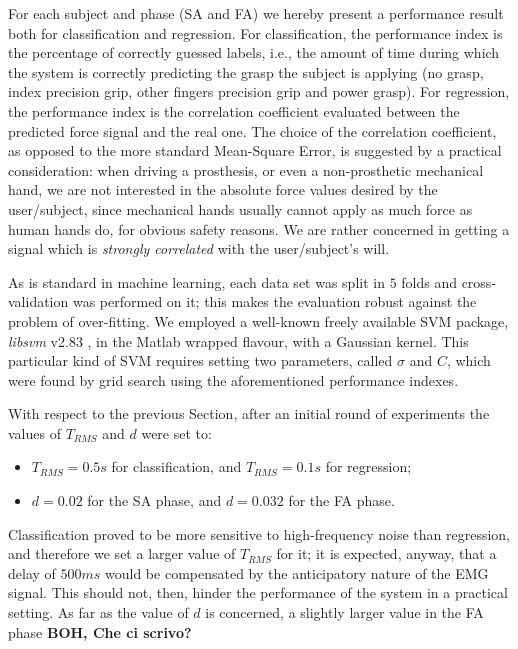 For each subject and phase (SA and FA) we hereby present a performance
result both for classification and regression. For classification, the
performance index is the percentage of correctly guessed labels, i.e.,
the amount of time during which the system is correctly predicting the
grasp the subject is applying (no grasp, index precision grip, other
fingers precision grip and power grasp). For regression, the
performance index is the correlation coefficient evaluated between the
predicted force signal and the real one. The choice of the correlation
coefficient, as opposed to the more standard Mean-Square Error, is
suggested by a practical consideration: when driving a prosthesis, or
even a non-prosthetic mechanical hand, we are not interested in the
absolute force values desired by the user/subject, since mechanical
hands usually cannot apply as much force as human hands do, for
obvious safety reasons. We are rather concerned in getting a signal
which is \emph{strongly correlated} with the user/subject's will.

As is standard in machine learning, each data set was split in $5$
folds and cross-validation was performed on it; this makes the
evaluation robust against the problem of over-fitting. We employed a
well-known freely available SVM package, \emph{libsvm} v2.83
\cite{ChangL01}, in the Matlab wrapped flavour, with a Gaussian
kernel. This particular kind of SVM requires setting two parameters,
called $\sigma$ and $C$, which were found by grid search using the
aforementioned performance indexes.

With respect to the previous Section, after an initial round of
experiments the values of $T_{RMS}$ and $d$ were set to:

\begin{itemize}

  \item $T_{RMS}=0.5s$ for classification, and $T_{RMS}=0.1s$ for regression;

  \item $d=0.02$ for the SA phase, and $d=0.032$ for the FA phase.

\end{itemize}

Classification proved to be more sensitive to high-frequency noise
than regression, and therefore we set a larger value of $T_{RMS}$ for
it; it is expected, anyway, that a delay of $500ms$ would be
compensated by the anticipatory nature of the EMG signal. This should
not, then, hinder the performance of the system in a practical
setting. As far as the value of $d$ is concerned, a slightly larger
value in the FA phase \textbf{BOH, Che ci scrivo?}

